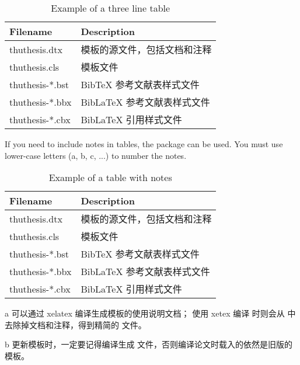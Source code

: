 \begin{table}
  \centering
  \caption{Example of a three line table}
  \begin{tabular}{ll}
    \toprule
    Filename          & Description                         \\
    \midrule
    thuthesis.dtx   & 模板的源文件，包括文档和注释 \\
    thuthesis.cls   & 模板文件                     \\
    thuthesis-*.bst & BibTeX 参考文献表样式文件    \\
    thuthesis-*.bbx & BibLaTeX 参考文献表样式文件  \\
    thuthesis-*.cbx & BibLaTeX 引用样式文件        \\
    \bottomrule
  \end{tabular}
  \label{tab:three-line}
\end{table}

If you need to include notes in tables, the package  can be used.
You must use lower-case letters (a, b, c, ...) to number the notes.

\begin{table}
  \centering
  \begin{threeparttable}[c]
    \caption{Example of a table with notes}
    \label{tab:three-part-table}
    \begin{tabular}{ll}
      \toprule
      Filename                 & Description                         \\
      \midrule
      thuthesis.dtx\tnote{a} & 模板的源文件，包括文档和注释 \\
      thuthesis.cls\tnote{b} & 模板文件                     \\
      thuthesis-*.bst        & BibTeX 参考文献表样式文件    \\
      thuthesis-*.bbx        & BibLaTeX 参考文献表样式文件  \\
      thuthesis-*.cbx        & BibLaTeX 引用样式文件        \\
      \bottomrule
    \end{tabular}
    \begin{tablenotes}
      \item [a] 可以通过 xelatex 编译生成模板的使用说明文档；
        使用 xetex 编译  时则会从  中去除掉文档和注释，得到精简的  文件。
      \item [b] 更新模板时，一定要记得编译生成  文件，否则编译论文时载入的依然是旧版的模板。
    \end{tablenotes}
  \end{threeparttable}
\end{table}


